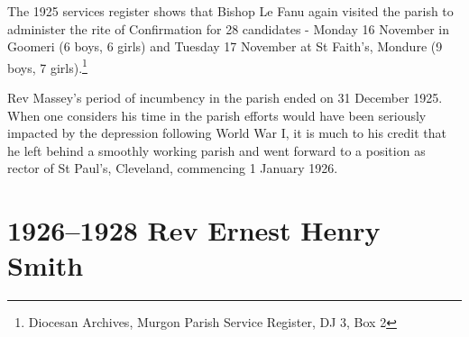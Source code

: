 \smallskip


The 1925 services register shows that Bishop Le Fanu again visited the parish to administer the rite of Confirmation for 28 candidates - Monday 16 November in Goomeri (6 boys, 6 girls) and Tuesday 17 November at St Faith's, Mondure (9 boys, 7 girls).\footnote{Diocesan Archives, Murgon Parish Service Register, DJ 3, Box 2}


Rev Massey's period of incumbency in the parish ended on 31 December 1925. When one considers his time in the parish efforts would have been seriously impacted by the depression following World War I, it is much to his credit that he left behind a smoothly working parish and went forward to a position as rector of St Paul's, Cleveland, commencing 1 January 1926.



\balance


\printendnotes[custom]
\setcounter{endnote}{0}
\chapter{1926--1928 Rev Ernest Henry Smith}
\nobalance








